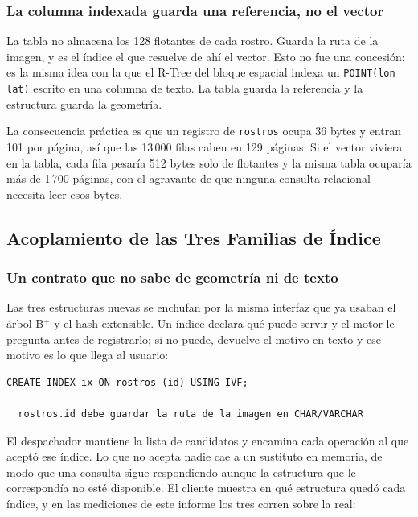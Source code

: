 \documentclass[a4paper,12pt]{article}
\begin{document}
\subsubsection{La columna indexada guarda una referencia, no el vector}

La tabla no almacena los 128 flotantes de cada rostro. Guarda la ruta de la
imagen, y es el índice el que resuelve de ahí el vector. Esto no fue una
concesión: es la misma idea con la que el R-Tree del bloque espacial indexa un
\texttt{POINT(lon lat)} escrito en una columna de texto. La tabla guarda la
referencia y la estructura guarda la geometría.

La consecuencia práctica es que un registro de \texttt{rostros} ocupa 36 bytes y
entran 101 por página, así que las 13\,000 filas caben en 129 páginas. Si el
vector viviera en la tabla, cada fila pesaría 512 bytes solo de flotantes y la
misma tabla ocuparía más de 1\,700 páginas, con el agravante de que ninguna
consulta relacional necesita leer esos bytes.

\subsection{Acoplamiento de las Tres Familias de Índice}

\subsubsection{Un contrato que no sabe de geometría ni de texto}

Las tres estructuras nuevas se enchufan por la misma interfaz que ya usaban el
árbol B$^+$ y el hash extensible. Un índice declara qué puede servir y el motor
le pregunta antes de registrarlo; si no puede, devuelve el motivo en texto y ese
motivo es lo que llega al usuario:

\begin{lstlisting}[caption={Motivo de rechazo de un índice}]
CREATE INDEX ix ON rostros (id) USING IVF;

  rostros.id debe guardar la ruta de la imagen en CHAR/VARCHAR
\end{lstlisting}

El despachador mantiene la lista de candidatos y encamina cada operación al que
aceptó ese índice. Lo que no acepta nadie cae a un sustituto en memoria, de modo
que una consulta sigue respondiendo aunque la estructura que le correspondía no
esté disponible. El cliente muestra en qué estructura quedó cada índice, y en
las mediciones de este informe los tres corren sobre la real:
\end{document}
